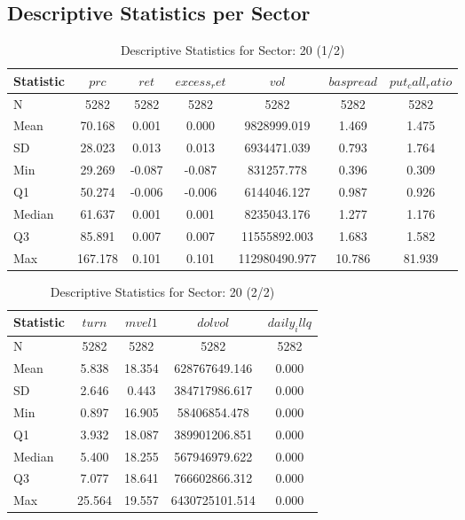 \subsection{Descriptive Statistics per Sector}
\begin{table}[ht]
    \centering

    
    \caption{Descriptive Statistics for Sector: 20 (1/2)}
    \label{tab:sec20_a}
    
    \begin{tabular}{lcccccc}
    \toprule
    Statistic & $prc$ & $ret$ & $excess_ret$ & $vol$ & $baspread$ & $put_call_ratio$ \\\midrule
    N & 5282 & 5282 & 5282 & 5282 & 5282 & 5282 \\
    Mean & 70.168 & 0.001 & 0.000 & 9828999.019 & 1.469 & 1.475 \\
    SD & 28.023 & 0.013 & 0.013 & 6934471.039 & 0.793 & 1.764 \\
    Min & 29.269 & -0.087 & -0.087 & 831257.778 & 0.396 & 0.309 \\
    Q1 & 50.274 & -0.006 & -0.006 & 6144046.127 & 0.987 & 0.926 \\
    Median & 61.637 & 0.001 & 0.001 & 8235043.176 & 1.277 & 1.176 \\
    Q3 & 85.891 & 0.007 & 0.007 & 11555892.003 & 1.683 & 1.582 \\
    Max & 167.178 & 0.101 & 0.101 & 112980490.977 & 10.786 & 81.939 \\
    \bottomrule
    \end{tabular}

    \end{table}
    
    \begin{table}[ht]
    \centering

    
    \caption{Descriptive Statistics for Sector: 20 (2/2)}
    \label{tab:sec20_b}
    
    \begin{tabular}{lcccc}
    \toprule
    Statistic & $turn$ & $mvel1$ & $dolvol$ & $daily_illq$ \\\midrule
    N & 5282 & 5282 & 5282 & 5282 \\
    Mean & 5.838 & 18.354 & 628767649.146 & 0.000 \\
    SD & 2.646 & 0.443 & 384717986.617 & 0.000 \\
    Min & 0.897 & 16.905 & 58406854.478 & 0.000 \\
    Q1 & 3.932 & 18.087 & 389901206.851 & 0.000 \\
    Median & 5.400 & 18.255 & 567946979.622 & 0.000 \\
    Q3 & 7.077 & 18.641 & 766602866.312 & 0.000 \\
    Max & 25.564 & 19.557 & 6430725101.514 & 0.000 \\
    \bottomrule
    \end{tabular}

    \end{table}
    
